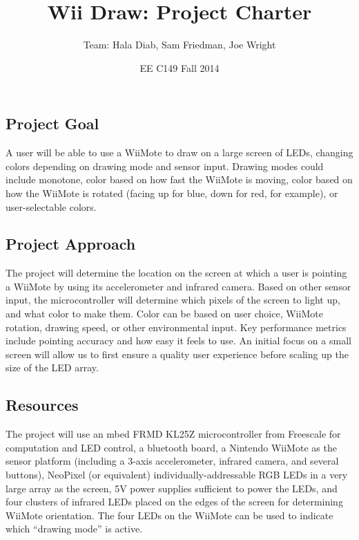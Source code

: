 \documentclass[letterpaper]{article}
\title{Wii Draw: Project Charter}
\author{Team: Hala Diab, Sam Friedman, Joe Wright}
\date{EE C149 Fall 2014}
\begin{document}
\maketitle

\subsection*{Project Goal}
A user will be able to use a WiiMote to draw on a large screen of LEDs,
changing colors depending on drawing mode and sensor input. Drawing modes
could include monotone, color based on how fast the WiiMote is moving, color
based on how the WiiMote is rotated (facing up for blue, down for red, for
example), or user-selectable colors.
\subsection*{Project Approach}
The project will determine the location on the screen at which a user is pointing
a WiiMote by using its accelerometer and infrared camera. Based on other
sensor input, the microcontroller will determine which pixels of the screen to
light up, and what color to make them. Color can be based on user choice,
WiiMote rotation, drawing speed, or other environmental input. Key performance
metrics include pointing accuracy and how easy it feels to use. An initial
focus on a small screen will allow us to first ensure a quality user
experience before scaling up the size of the LED array.
\subsection*{Resources}
The project will use an mbed FRMD KL25Z microcontroller from Freescale for
computation and LED control, a bluetooth board, a
Nintendo WiiMote as the sensor platform (including a 3-axis accelerometer,
infrared camera, and several buttons), NeoPixel (or equivalent)
individually-addressable RGB LEDs in a very large array as the screen, 5V
power supplies sufficient to power the LEDs, and
four clusters of infrared LEDs placed on the edges of the screen for
determining WiiMote orientation. The four LEDs on the WiiMote can be used to
indicate which ``drawing mode'' is active.
\end{document}
